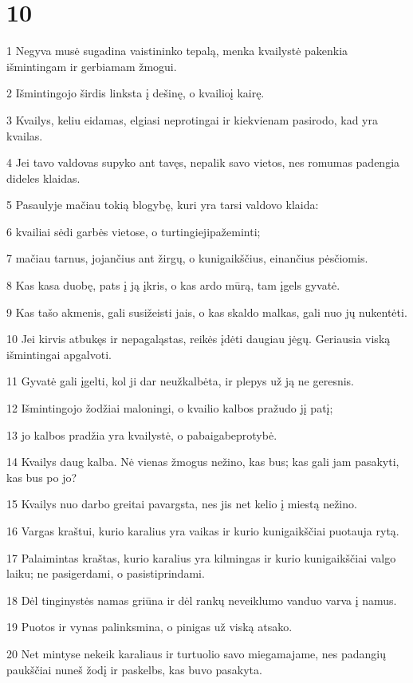 \chapter{10}


\par 1 Negyva musė sugadina vaistininko tepalą, menka kvailystė pakenkia išmintingam ir gerbiamam žmogui. 
\par 2 Išmintingojo širdis linksta į dešinę, o kvailio­į kairę. 
\par 3 Kvailys, keliu eidamas, elgiasi neprotingai ir kiekvienam pasirodo, kad yra kvailas. 
\par 4 Jei tavo valdovas supyko ant tavęs, nepalik savo vietos, nes romumas padengia dideles klaidas. 
\par 5 Pasaulyje mačiau tokią blogybę, kuri yra tarsi valdovo klaida: 
\par 6 kvailiai sėdi garbės vietose, o turtingieji­pažeminti; 
\par 7 mačiau tarnus, jojančius ant žirgų, o kunigaikščius, einančius pėsčiomis. 
\par 8 Kas kasa duobę, pats į ją įkris, o kas ardo mūrą, tam įgels gyvatė. 
\par 9 Kas tašo akmenis, gali susižeisti jais, o kas skaldo malkas, gali nuo jų nukentėti. 
\par 10 Jei kirvis atbukęs ir nepagaląstas, reikės įdėti daugiau jėgų. Geriausia viską išmintingai apgalvoti. 
\par 11 Gyvatė gali įgelti, kol ji dar neužkalbėta, ir plepys už ją ne geresnis. 
\par 12 Išmintingojo žodžiai maloningi, o kvailio kalbos pražudo jį patį; 
\par 13 jo kalbos pradžia yra kvailystė, o pabaiga­beprotybė. 
\par 14 Kvailys daug kalba. Nė vienas žmogus nežino, kas bus; kas gali jam pasakyti, kas bus po jo? 
\par 15 Kvailys nuo darbo greitai pavargsta, nes jis net kelio į miestą nežino. 
\par 16 Vargas kraštui, kurio karalius yra vaikas ir kurio kunigaikščiai puotauja rytą. 
\par 17 Palaimintas kraštas, kurio karalius yra kilmingas ir kurio kunigaikščiai valgo laiku; ne pasigerdami, o pasistiprindami. 
\par 18 Dėl tinginystės namas griūna ir dėl rankų neveiklumo vanduo varva į namus. 
\par 19 Puotos ir vynas palinksmina, o pinigas už viską atsako. 
\par 20 Net mintyse nekeik karaliaus ir turtuolio savo miegamajame, nes padangių paukščiai nuneš žodį ir paskelbs, kas buvo pasakyta.



